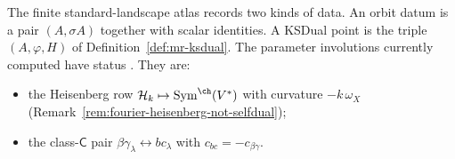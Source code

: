 \begin{remark}
\label{rem:mr-ksdual-witnesses}
The finite standard-landscape atlas records two kinds of data.  An
orbit datum is a pair $(A,\sigma A)$ together with scalar identities.
A KSDual point is the triple $(A,\varphi,H)$ of
Definition~\ref{def:mr-ksdual}.  The parameter involutions currently
computed have status \ClaimStatusComputed.  They are:
\begin{itemize}
\item the Heisenberg row
$\mathcal H_k\mapsto \mathrm{Sym}^{\ch}(V^*)$ with curvature
$-k\,\omega_X$
\textup{(}Remark~\ref{rem:fourier-heisenberg-not-selfdual}\textup{)};
\item the class-$\mathsf C$ pair
$\beta\gamma_\lambda\leftrightarrow bc_\lambda$ with
$c_{bc}=-c_{\beta\gamma}$.
\end{itemize}


\end{remark}
